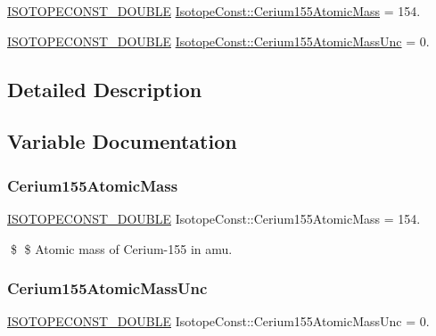 \begin{DoxyCompactItemize}
\item 
\mbox{\hyperlink{group___isotope_const-_macros_ga8f45a7272ce02c0b4c65c44636ed719a}{I\+S\+O\+T\+O\+P\+E\+C\+O\+N\+S\+T\+\_\+\+D\+O\+U\+B\+LE}} \mbox{\hyperlink{group___isotope_const-_cerium-_ce155_ga43327ba76aa3be7a80abdf4163a28601}{Isotope\+Const\+::\+Cerium155\+Atomic\+Mass}} = 154.
\item 
\mbox{\hyperlink{group___isotope_const-_macros_ga8f45a7272ce02c0b4c65c44636ed719a}{I\+S\+O\+T\+O\+P\+E\+C\+O\+N\+S\+T\+\_\+\+D\+O\+U\+B\+LE}} \mbox{\hyperlink{group___isotope_const-_cerium-_ce155_ga2459978b30d5329d4b5a118c921023d8}{Isotope\+Const\+::\+Cerium155\+Atomic\+Mass\+Unc}} = 0.
\end{DoxyCompactItemize}


\subsection{Detailed Description}


\subsection{Variable Documentation}
\mbox{\label{group___isotope_const-_cerium-_ce155_ga43327ba76aa3be7a80abdf4163a28601}} 
\subsubsection{\texorpdfstring{Cerium155\+Atomic\+Mass}{Cerium155AtomicMass}}
{\footnotesize\ttfamily \mbox{\hyperlink{group___isotope_const-_macros_ga8f45a7272ce02c0b4c65c44636ed719a}{I\+S\+O\+T\+O\+P\+E\+C\+O\+N\+S\+T\+\_\+\+D\+O\+U\+B\+LE}} Isotope\+Const\+::\+Cerium155\+Atomic\+Mass = 154.}

\$ \$ Atomic mass of Cerium-\/155 in amu. \mbox{\label{group___isotope_const-_cerium-_ce155_ga2459978b30d5329d4b5a118c921023d8}} 
\subsubsection{\texorpdfstring{Cerium155\+Atomic\+Mass\+Unc}{Cerium155AtomicMassUnc}}
{\footnotesize\ttfamily \mbox{\hyperlink{group___isotope_const-_macros_ga8f45a7272ce02c0b4c65c44636ed719a}{I\+S\+O\+T\+O\+P\+E\+C\+O\+N\+S\+T\+\_\+\+D\+O\+U\+B\+LE}} Isotope\+Const\+::\+Cerium155\+Atomic\+Mass\+Unc = 0.}

